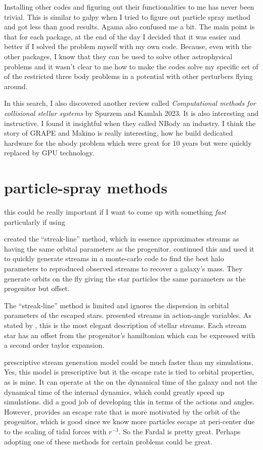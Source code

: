     Installing other codes and figuring out their functionalities to me has never been trivial. This is similar to galpy when I tried to figure out particle spray method and got less than good results. Agama also confused me a bit. The main point is that for each package, at the end of the day I decided that it was easier and better if I solved the problem myself with my own code. Because, even with the other packages, I know that they can be used to solve other astrophysical problems and it wasn't clear to me how to make the codes solve my specific set of of the restricted three body problems in a potential with other perturbers flying around. 

    In this search, I also discovered another review called \textit{Computational methods for collisional stellar systems} by Spurzem and Kamlah 2023. It is also interesting and instructive. I found it insightful when they called NBody an industry. I think the story of GRAPE and Makino is really interesting, how he build dedicated hardware for the nbody problem which were great for 10 years but were quickly replaced by GPU technology. 

    \section{particle-spray methods}

    this could be really important if I want to come up with something \textit{fast} particularly if using 

    \citet{2012MNRAS.420.2700K} created the ``streak-line'' method, which in essence approximates streams as having the same orbital parameters as the progenitor. \citet{2014ApJ...795...94B} continued this and used it to quickly generate streams in a monte-carlo code to find the best halo parameters to reproduced observed streams to recover a galaxy's mass. They generate orbits on the fly giving the star particles the same parameters as the progenitor but offset. 

    The ``streak-line'' method is limited and ignores the dispersion in orbital parameters of the escaped stars. \citet{2011MNRAS.413.1852E} presented streams in action-angle variables. As stated by \citet{2015MNRAS.452..301F}, this is the most elegant description of stellar streams. Each stream star has an offset from the progenitor's hamiltonian which can be expressed with a second order taylor expansion. 

    \citet{2015MNRAS.452..301F} prescriptive stream generation model could be much faster than my simulations. Yes, this model is prescriptive but it the escape rate is tied to orbital properties, as is mine. It can operate at the on the dynamical time of the galaxy and not the dynamical time of the internal dynamics, which could greatly speed up simulations. \citet{2014ApJ...795...95B} did a good job of developing this in terms of the actions and angles. However, \citet{2015MNRAS.452..301F} provides an escape rate that is more motivated by the orbit of the progenitor, which is good since we know more particles escape at peri-center due to the scaling of tidal forces with $r^{-3}$. So the Fardal is pretty great. Perhaps adopting one of these methods for certain problems could be great. 

